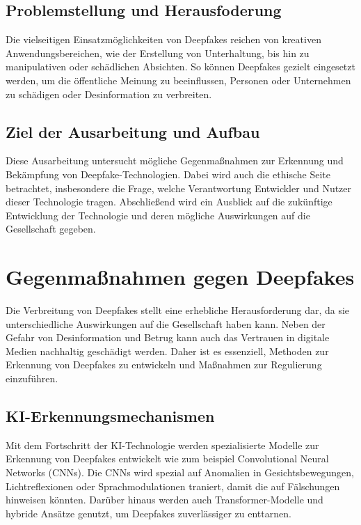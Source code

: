 \documentclass[a4paper,12pt]{article}
\begin{document}
\subsection{Problemstellung und Herausfoderung}
Die vielseitigen Einsatzmöglichkeiten von Deepfakes reichen von kreativen Anwendungsbereichen, 
wie der Erstellung von Unterhaltung, bis hin zu manipulativen oder schädlichen Absichten. 
So können Deepfakes gezielt eingesetzt werden, um die öffentliche Meinung zu beeinflussen, 
Personen oder Unternehmen zu schädigen oder Desinformation zu verbreiten. \cite{CounterExtremism2020}\\
\subsection{Ziel der Ausarbeitung und Aufbau}
Diese Ausarbeitung untersucht mögliche Gegenmaßnahmen zur Erkennung und Bekämpfung von Deepfake-Technologien. 
Dabei wird auch die ethische Seite betrachtet, 
insbesondere die Frage, welche Verantwortung Entwickler und Nutzer dieser Technologie tragen. 
Abschließend wird ein Ausblick auf die zukünftige Entwicklung der Technologie und deren mögliche Auswirkungen auf die Gesellschaft gegeben.
\newpage

\section{Gegenmaßnahmen gegen Deepfakes}
Die Verbreitung von Deepfakes stellt eine erhebliche Herausforderung dar, 
da sie unterschiedliche Auswirkungen auf die Gesellschaft haben kann. 
Neben der Gefahr von Desinformation und Betrug kann auch das Vertrauen in digitale Medien nachhaltig geschädigt werden. 
Daher ist es essenziell, Methoden zur Erkennung von Deepfakes zu entwickeln und Maßnahmen zur Regulierung einzuführen. \cite{CounterExtremism2020}

\subsection{KI-Erkennungsmechanismen}
Mit dem Fortschritt der KI-Technologie werden spezialisierte Modelle zur Erkennung von Deepfakes entwickelt wie zum beispiel
Convolutional Neural Networks (CNNs).
Die CNNs wird spezial auf 
Anomalien in Gesichtsbewegungen, 
Lichtreflexionen oder Sprachmodulationen traniert, damit  
die auf Fälschungen hinweisen könnten. 
Darüber hinaus werden auch Transformer-Modelle und hybride Ansätze genutzt, 
um Deepfakes zuverlässiger zu enttarnen. \cite{BVDW2024}
\end{document}

